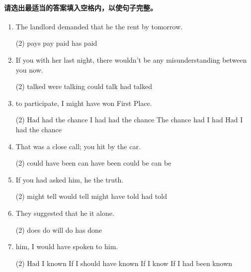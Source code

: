 \paragraph{请选出最适当的答案填入空格内，以使句子完整。}

\begin{enumerate}
\item The landlord demanded that he \ttu the rent by tomorrow.
  \begin{tasks}(2)
    \task pays
    \task pay
    \task paid
    \task has paid
  \end{tasks}

\item If you \ttu with her last night, there wouldn't be any misunderstanding between you now.
  \begin{tasks}(2)
    \task talked
    \task were talking
    \task could talk
    \task had talked
  \end{tasks}

\item \ttu to participate, I might have won First Place.
  \begin{tasks}(2)
    \task Had had the chance
    \task I had had the chance
    \task The chance had I had
    \task Had I had the chance
  \end{tasks}

\item That was a close call; you \ttu hit by the car.
  \begin{tasks}(2)
    \task could have been
    \task can have been
    \task could be
    \task can be
  \end{tasks}

\item If you had asked him, he \ttu the truth.
  \begin{tasks}(2)
    \task might tell
    \task would tell
    \task might have told
    \task had told
  \end{tasks}

\item They suggested that he \ttu it alone.
  \begin{tasks}(2)
    \task does
    \task do
    \task will do
    \task has done
  \end{tasks}

\item \ttu him, I would have spoken to him.
  \begin{tasks}(2)
    \task Had I known
    \task If I should have known
    \task If I know
    \task If I had been known
  \end{tasks}


\end{enumerate}
